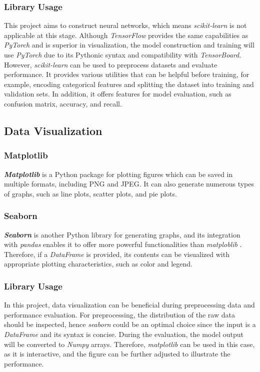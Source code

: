 \documentclass[12pt,twoside]{report}
\begin{document}
\subsubsection{Library Usage}
This project aims to construct neural networks, which means \textit{scikit-learn} is not applicable at this stage. Although \textit{TensorFlow} provides the same capabilities as \textit{PyTorch} and is superior in visualization, the model construction and training will use \textit{PyTorch} due to its Pythonic syntax and compatibility with \textit{TensorBoard}. 
\\

However, \textit{scikit-learn} can be used to preprocess datasets and evaluate performance. It provides various utilities that can be helpful before training, for example, encoding categorical features and splitting the dataset into training and validation sets. In addition, it offers features for model evaluation, such as confusion matrix, accuracy, and recall. 

\subsection{Data Visualization}
\subsubsection{Matplotlib}
\textbf{\textit{Matplotlib}} is a Python package for plotting figures which can be saved in multiple formats, including PNG and JPEG. It can also generate numerous types of graphs, such as line plots, scatter plots, and pie plots.

\subsubsection{Seaborn}
\textbf{\textit{Seaborn}} is another Python library for generating graphs, and its integration with \textit{pandas} enables it to offer more powerful functionalities than \textit{matploblib} \citep{RN16}. Therefore, if a \textit{DataFrame} is provided, its contents can be visualized with appropriate plotting characteristics, such as color and legend.

\subsubsection{Library Usage}
In this project, data visualization can be beneficial during preprocessing data and performance evaluation. For preprocessing, the distribution of the raw data should be inspected, hence \textit{seaborn} could be an optimal choice since the input is a \textit{DataFrame} and its syntax is concise. During the evaluation, the model output will be converted to \textit{Numpy} arrays. Therefore, \textit{matplotlib} can be used in this case, as it is interactive, and the figure can be further adjusted to illustrate the performance. 
\end{document}
